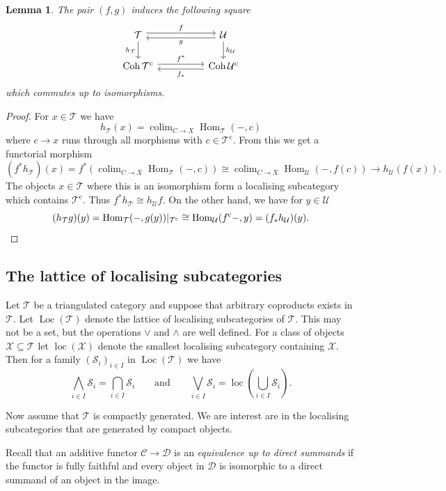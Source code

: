 \documentclass{amsart}[a4]
\newtheorem{lemma}[theorem]{Lemma}
\theoremstyle{definition}
\theoremstyle{remark}
\numberwithin{equation}{section}
\newcommand{\Coh}{\operatorname{Coh}}
\newcommand{\colim}{\operatorname{colim}}
\newcommand{\Hom}{\operatorname{Hom}}
\newcommand{\loc}{\operatorname{loc}}
\newcommand{\Loc}{\operatorname{Loc}}
\newcommand{\lto}{\longrightarrow}
\newcommand{\cat}{\mathcal}
\begin{document}
\begin{lemma}\label{le:res-yoneda}
  The pair $(f,g)$ induces the following square
\begin{equation*}
  \begin{tikzcd}
     \cat T \ar[rr,yshift=2.5,"f"]\ar[d,swap,"h_{\cat T}"] && \ar[ll,yshift=-2.5,"g"]
     \cat U \ar[d,"h_{\cat U}"]
     \\
  \Coh{\cat T^{\mathrm c}} \ar[rr,yshift=2.5,"f^*"] && \ar[ll,yshift=-2.5,"f_*"]
  \Coh{\cat U^{\mathrm c}}
\end{tikzcd}
\end{equation*}
which commutes up to isomorphisms.
\end{lemma}
\begin{proof}
For $x\in\cat T$ we have \[h_\cat T(x)=\colim_{C\to X}\Hom_\cat T(-,c)\] where
$c\to x$ runs through all morphisms with $c\in\cat T^{\mathrm c}$. From this we
get a functorial morphism
\[(f^*h_\cat T)(x)=f^*(\colim_{C\to X}\Hom_\cat T(-,c))\cong \colim_{C\to
    X}\Hom_\cat U(-,f(c))\lto h_{\cat U}(f(x)).
\]
The objects  $x\in\cat T$ where this is an isomorphism form a localising
subcategory which contains $\cat T^{\mathrm c}$. Thus $f^*h_\cat T\cong h_{\cat
  U}f$. On the other hand, we have for $y\in\cat U$
\[(h_\cat T g)(y)=\Hom_\cat T(-,g(y))|_{\cat T^{\mathrm c}}\cong\Hom_\cat
  U(f^{\mathrm c}-,y)=(f_*h_\cat U)(y).\qedhere\]
\end{proof}


\subsection*{The lattice of localising subcategories}

Let $\cat T$ be a triangulated category and suppose that arbitrary
coproducts exists in $\cat T$. Let $\Loc(\cat T)$ denote the lattice
of localising subcategories of $\cat T$.  This may not be a set, but
the operations $\vee$ and $\wedge$ are well defined.  For a class of
objects $\cat X\subseteq\cat T$ let $\loc(\cat X)$ denote the smallest
localising subcategory containing $\cat X$. Then for a family
$(\cat S_i)_{i\in I}$ in $\Loc(\cat T)$ we have
\[\bigwedge_{i\in I}\cat S_i=\bigcap_{i\in I}\cat
  S_i\qquad\text{and}\qquad \bigvee_{i\in I}\cat S_i=\loc\left(\bigcup_{i\in
    I}\cat S_i\right).\]

Now assume that $\cat T$ is compactly generated. We are interest are
in the localising subcategories that are generated by compact objects.

Recall that an additive functor $\cat C\to\cat D$ is an
\emph{equivalence up to direct summands} if the functor is fully
faithful and every object in $\cat D$ is isomorphic to a direct
summand of an object in the image.
\end{document}
